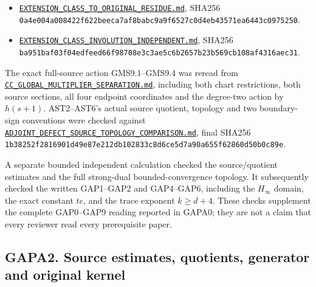 \begin{itemize}
\tightlist
\item
  \href{https://github.com/KokunoYumeto/zeta-function-research-reader/blob/main/workbenches/splitzero-tandem/continuations/20260925-source-endpoint-and-section/EXTENSION_CLASS_TO_ORIGINAL_RESIDUE.md}{\nolinkurl{EXTENSION_CLASS_TO_ORIGINAL_RESIDUE.md}},
  SHA256
  \nolinkurl{0a4e004a008422f622beeca7af8babc9a9f6527c0d4eb43571ea6443c0975250}.
\item
  \href{https://github.com/KokunoYumeto/zeta-function-research-reader/blob/main/workbenches/splitzero-tandem/continuations/20260925-source-endpoint-and-section/EXTENSION_CLASS_INVOLUTION_INDEPENDENT.md}{\nolinkurl{EXTENSION_CLASS_INVOLUTION_INDEPENDENT.md}},
  SHA256
  \nolinkurl{ba951baf03f04edfeed66f98708e3c3ae5c6b2657b23b569cb108af4316aec31}.
\end{itemize}

The exact full-source action GMS9.1--GMS9.4 was reread from
\href{https://github.com/KokunoYumeto/zeta-function-research-reader/blob/main/workbenches/splitzero-tandem/continuations/20260925-source-endpoint-and-section/sources/programme/cc_sheaf/CC_GLOBAL_MULTIPLIER_SEPARATION.md}{\nolinkurl{CC_GLOBAL_MULTIPLIER_SEPARATION.md}},
including both chart restrictions, both source sections, all four
endpoint coordinates and the degree-two action by \(h(s+1)\).
AST2--AST6's actual source quotient, topology and two boundary-sign
conventions were checked against
\href{https://github.com/KokunoYumeto/zeta-function-research-reader/blob/main/workbenches/splitzero-tandem/continuations/20260925-source-endpoint-and-section/ADJOINT_DEFECT_SOURCE_TOPOLOGY_COMPARISON.md}{\nolinkurl{ADJOINT_DEFECT_SOURCE_TOPOLOGY_COMPARISON.md}},
final SHA256
\nolinkurl{1b38252f2816901d49e87e212db102833c8d6ce5d7a90a655f62860d50b0c89e}.

A separate bounded independent calculation checked the source/quotient
estimates and the full strong-dual bounded-convergence topology. It
subsequently checked the written GAP1--GAP2 and GAP4--GAP6, including
the \(H_\infty\) domain, the exact constant \(te\), and the trace
exponent \(k\ge d+4\). These checks supplement the complete GAP0--GAP9
reading reported in GAPA0; they are not a claim that every reviewer read
every prerequisite paper.

\subsection{GAPA2. Source estimates, quotients, generator and original
kernel}\label{gapa2.-source-estimates-quotients-generator-and-original-kernel}

